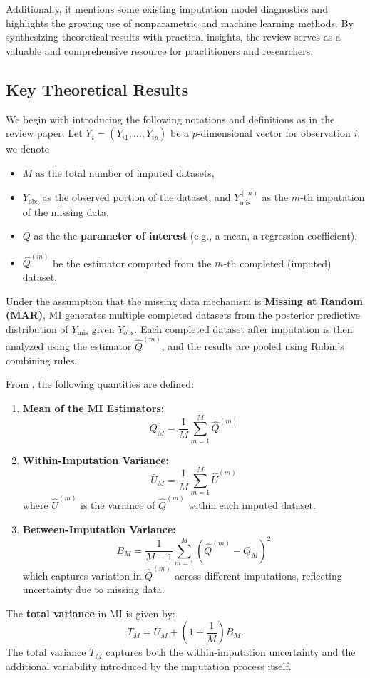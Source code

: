 \documentclass[12pt,oneside]{amsart}
\theoremstyle{definition}
\theoremstyle{remark}
\numberwithin{equation}{section}
\begin{document}
Additionally, it mentions some existing imputation model diagnostics and highlights the growing use of nonparametric and machine learning methods. By synthesizing theoretical results with practical insights, the review serves as a valuable and comprehensive resource for practitioners and researchers.

\subsection{Key Theoretical Results}
We begin with introducing the following notations and definitions as in the review paper. Let $Y_i = (Y_{i1}, \ldots, Y_{ip})$ be a $p$-dimensional vector for observation $i$, we denote 
\begin{itemize}
    \item $M$ as the total number of imputed datasets,
    \item $Y_{\text{obs}}$ as the observed portion of the dataset, and $Y_{\text{mis}}^{(m)}$ as the $m$-th imputation of the missing data,
    \item $Q$ as the the \textbf{parameter of interest} (e.g., a mean, a regression coefficient),
    \item $\hat{Q}^{(m)}$ be the estimator computed from the $m$-th completed (imputed) dataset.
\end{itemize}
Under the assumption that the missing data mechanism is \textbf{Missing at Random (MAR)}, MI generates multiple completed datasets from the posterior predictive distribution of $Y_{\text{mis}}$ given $Y_{\text{obs}}$. Each completed dataset after imputation is then analyzed using the estimator $\hat{Q}^{(m)}$, and the results are pooled using Rubin’s combining rules.

From \citep{rubin}, the following quantities are defined:
\begin{enumerate}
    \item \textbf{Mean of the MI Estimators:}
    \[
    \bar{Q}_M = \frac{1}{M} \sum_{m=1}^{M} \hat{Q}^{(m)}
    \]
    
    \item \textbf{Within-Imputation Variance:}
    \[
    \bar{U}_M = \frac{1}{M} \sum_{m=1}^{M} \hat{U}^{(m)}
    \]
    where $\hat{U}^{(m)}$ is the variance of $\hat{Q}^{(m)}$ within each imputed dataset.
    
    \item \textbf{Between-Imputation Variance:}
    \[
    B_M = \frac{1}{M - 1} \sum_{m=1}^{M} (\hat{Q}^{(m)} - \bar{Q}_M)^2
    \]
    which captures variation in $\hat{Q}^{(m)}$ across different imputations, reflecting uncertainty due to missing data.
\end{enumerate} 
The \textbf{total variance} in MI is given by:
\begin{equation}
    T_M = \bar{U}_M + \left( 1 + \frac{1}{M} \right) B_M.
\end{equation}
The total variance $T_M$ captures both the within-imputation uncertainty and the additional variability introduced by the imputation process itself.
\end{document}
